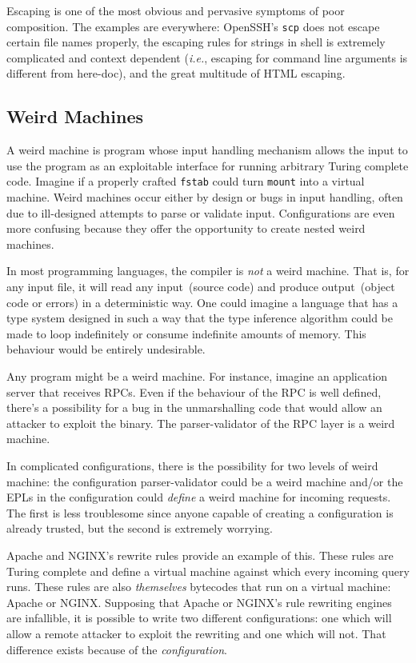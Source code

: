 \documentclass[letterpaper,twocolumn,10pt]{article}
\begin{document}
Escaping is one of the most obvious and pervasive symptoms of poor composition. The examples are everywhere: OpenSSH's \texttt{scp} does not escape certain file names properly, the escaping rules for strings in shell is extremely complicated and context dependent (\emph{i.e.}, escaping for command line arguments is different from here-doc), and the great multitude of HTML escaping.

\subsection{Weird Machines}
A weird machine is program whose input handling mechanism allows the input to use the program as an exploitable interface for running arbitrary Turing complete code. Imagine if a properly crafted \texttt{fstab} could turn \texttt{mount} into a virtual machine. Weird machines occur either by design or bugs in input handling, often due to ill-designed attempts to parse or validate input. Configurations are even more confusing because they offer the opportunity to create nested weird machines.

In most programming languages, the compiler is \emph{not} a weird machine. That is, for any input file, it will read any input~(source code) and produce output~(object code or errors) in a deterministic way. One could imagine a language that has a type system designed in such a way that the type inference algorithm could be made to loop indefinitely or consume indefinite amounts of memory. This behaviour would be entirely undesirable.

Any program might be a weird machine. For instance, imagine an application server that receives RPCs. Even if the behaviour of the RPC is well defined, there's a possibility for a bug in the unmarshalling code that would allow an attacker to exploit the binary. The parser-validator of the RPC layer is a weird machine.

In complicated configurations, there is the possibility for two levels of weird machine: the configuration parser-validator could be a weird machine and/or the EPLs in the configuration could \emph{define} a weird machine for incoming requests. The first is less troublesome since anyone capable of creating a configuration is already trusted, but the second is extremely worrying.

Apache and NGINX's rewrite rules provide an example of this. These rules are Turing complete and define a virtual machine against which every incoming query runs. These rules are also \emph{themselves} bytecodes that run on a virtual machine: Apache or NGINX. Supposing that Apache or NGINX's rule rewriting engines are infallible, it is possible to write two different configurations: one which will allow a remote attacker to exploit the rewriting and one which will not. That difference exists because of the \emph{configuration}.
\end{document}
